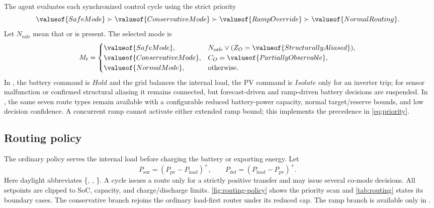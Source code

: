 The agent evaluates each synchronized control cycle using the strict priority
\begin{equation}
\label{eq:priority}
\valueof{SafeMode}\succ
\valueof{ConservativeMode}\succ
\valueof{RampOverride}\succ
\valueof{NormalRouting}.
\end{equation}
Let $N_{\mathrm{safe}}$ mean that  or  is present. The selected mode is
\begin{equation}
\label{eq:mode-selection}
M_t=
\begin{cases}
\valueof{SafeMode}, & N_{\mathrm{safe}}\vee
(Z_O=\valueof{StructurallyAliased}),\\
\valueof{ConservativeMode}, & C_O=\valueof{PartiallyObservable},\\
\valueof{NormalMode}, & \text{otherwise}.
\end{cases}
\end{equation}
In , the battery command is $Hold$ and the grid balances the internal load, the PV command is $Isolate$ only for an inverter trip; for sensor malfunction or confirmed structural aliasing it remains connected, but forecast-driven and ramp-driven battery decisions are suspended. In , the same seven route types remain available with a configurable reduced battery-power capacity, normal target/reserve bounds, and low decision confidence. A concurrent ramp cannot activate either extended ramp bound; this implements the precedence in \autoref{eq:priority}.

\subsection{Routing policy}

The ordinary policy serves the internal load before charging the battery or exporting energy. Let
\begin{equation}
\label{eq:surplus-deficit}
P_{\mathrm{sur}}=(P_{\mathrm{pv}}-P_{\mathrm{load}})^{+},
\qquad
P_{\mathrm{def}}=(P_{\mathrm{load}}-P_{\mathrm{pv}})^{+}.
\end{equation}
Here daylight abbreviates \{, , \}. A cycle issues a route only for a strictly positive transfer and may issue several co-mode decisions. All setpoints are clipped to SoC, capacity, and charge/discharge limits.
\autoref{fig:routing-policy} shows the priority scan and \autoref{tab:routing} states its boundary cases. The conservative branch rejoins the ordinary load-first router under its reduced cap. The ramp branch is available only in .

